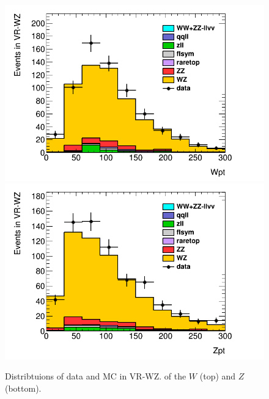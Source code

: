 \begin{centering}
\begin{figure}[htbp]
\centering
\includegraphics[width=.9\textwidth]{figures/dibosons/WZ_Wpt.png}
\includegraphics[width=.9\textwidth]{figures/dibosons/WZ_Zpt.png}
\caption{Distribtuions of data and \ac{MC} in VR-WZ. \pT of the $W$ (top) and $Z$ (bottom). \label{fig:diboson_wz2}}
\end{figure}
\end{centering}

